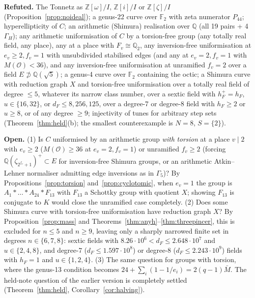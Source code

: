 \documentclass[11pt]{amsart}
\numberwithin{equation}{section}
\theoremstyle{plain}
\theoremstyle{definition}\newtheorem{definition}[theorem]{Definition}
\theoremstyle{remark}\newtheorem{remark}[theorem]{Remark}
\newcommand{\Z}{\mathbb{Z}}\newcommand{\Q}{\mathbb{Q}}\newcommand{\C}{\mathbb{C}}\newcommand{\F}{\mathbb{F}}\newcommand{\R}{\mathbb{R}}
\begin{document}
\textbf{Refuted.} The Tonnetz as $\Z[\omega]/I$, $\Z[i]/I$ or $\Z[\zeta]/I$ (Proposition~\ref{prop:noideal}); a genus-22 curve over $\F_2$ with zeta numerator $P_{44}$; hyperellipticity of $C$; an arithmetic (Shimura) realisation over $\Q$ (all 19 pairs + 4 $\Gamma_H$); any arithmetic uniformisation of $C$ by a torsion-free group (any totally real field, any place), any at a place with $F_v\cong\Q_2$, any inversion-free uniformisation at $e_v\ge2,f_v=1$ with unsubdivided stabilised edges (and any at $e_v=2,f_v=1$ with $M(\mathcal O)<36$), and any inversion-free uniformisation at unramified $f_v=2$ over a field $E\not\supset\Q(\sqrt5)$; a genus-4 curve over $\F_2$ containing the octic; a Shimura curve with reduction graph $X$ and torsion-free uniformisation over a totally real field of degree $\le5$, whatever its narrow class number, over a sextic field with $h_F^+=h_F$, $u\in\{16,32\}$, or $d_F\le8{,}256{,}125$, over a degree-7 or degree-8 field with $h_F\ge2$ or $u\ge8$, or of any degree $\ge9$; injectivity of tunes for arbitrary step sets (Theorem~\ref{thm:held}(b); the smallest counterexample is $N=8$, $S=\{2\}$).

\textbf{Open.} (1) Is $C$ uniformised by an arithmetic group \emph{with torsion} at a place $v\mid2$ with $e_v\ge2$ ($M(\mathcal O)\ge36$ at $e_v=2,f_v=1$) or unramified $f_v\ge2$ (forcing $\Q(\zeta_{2^{f_v}+1})^+\subset E$ for inversion-free Shimura groups, or an arithmetic Atkin--Lehner normaliser admitting edge inversions as in $\Gamma_5$)? By Propositions~\ref{prop:torsion} and~\ref{prop:cyclotomic}, when $e_v=1$ the group is $A_1*\dots*A_{24}*F_{13}$ with $F_{13}$ a Schottky group with quotient $X$; showing $F_{13}$ is conjugate to $K$ would close the unramified case completely. (2) Does some Shimura curve with torsion-free uniformisation have reduction graph $X$? By Proposition~\ref{prop:mass} and Theorems~\ref{thm:anyh}--\ref{thm:threepincer}, this is excluded for $n\le5$ and $n\ge9$, leaving only a sharply narrowed finite set in degrees $n\in\{6,7,8\}$: sextic fields with $8.26\cdot10^6<d_F\le2.648\cdot10^7$ and $u\in\{2,4,8\}$, and degree-7 ($d_F\le1.597\cdot10^8$) or degree-8 ($d_F\le2.243\cdot10^9$) fields with $h_F=1$ and $u\in\{1,2,4\}$. (3) The same question for groups with torsion, where the genus-13 condition becomes $24+\sum_i(1-1/e_i)=2(q-1)\bar M$. The held-note question of the earlier version is completely settled (Theorem~\ref{thm:held}, Corollary~\ref{cor:halving}).
\end{document}
